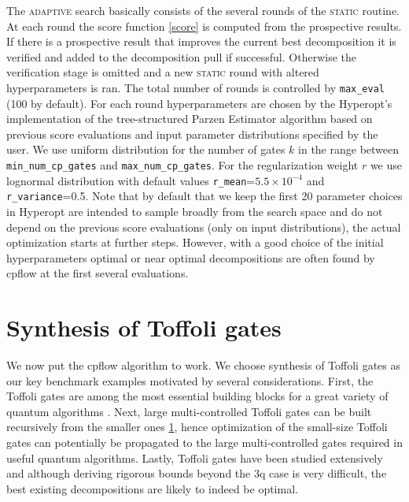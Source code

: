 \documentclass[draft, amsfonts, amssymb, aps, nofootinbib, twocolumn]{revtex4-2}
\newcommand{\cpflow}{\textrm {cpflow }}
\newcommand{\static}{\textsc{static }}
\newcommand{\adaptive}{\textsc{adaptive }}
\newcommand{\param}[1]{\texttt{#1}}
\begin{document}
The \adaptive search basically consists of the several rounds of the \static routine. At each round the score function \eqref{score}  is computed from the prospective results. If there is a prospective result that improves the current best decomposition it is verified and added to the decomposition pull if successful. Otherwise the verification stage is omitted and a new \static round with altered hyperparameters is ran. The total number of rounds is controlled by \param{max\_eval} (100 by default). For each round hyperparameters are chosen by the Hyperopt's implementation of the tree-structured Parzen Estimator algorithm \cite{hyperopt} based on previous score evaluations and input parameter distributions specified by the user. We use uniform distribution for the number of gates $k$ in the range between \param{min\_num\_cp\_gates} and \param{max\_num\_cp\_gates}. For the regularization weight $r$ we use lognormal distribution with default values \param{r\_mean}=$5.5\times10^{-4}$ and \param{r\_variance}=0.5. Note that by default that we keep the first 20 parameter choices in Hyperopt are intended to sample broadly from the search space and do not depend on the previous score evaluations (only on input distributions), the actual optimization starts at further steps. However, with a good choice of the initial hyperparameters optimal or near optimal decompositions are often found by \cpflow at the first several evaluations.
\section{Synthesis of Toffoli gates}
We now put the \cpflow algorithm to work. We choose synthesis of Toffoli gates as our key benchmark examples motivated by several considerations. First, the Toffoli gates are among the most essential building blocks for a great variety of quantum algorithms \cite{}. Next, large multi-controlled Toffoli gates can be built recursively from the smaller ones \ref{}, hence optimization of the small-size Toffoli gates can potentially be propagated to the large multi-controlled gates required in useful quantum algorithms. Lastly, Toffoli gates have been studied extensively \cite{Barenco1995, Song2003, Maslov, Shende2009, Schuch} and although deriving rigorous bounds beyond the 3q case is very difficult, the best existing decompositions are likely to indeed be optimal.
\end{document}
